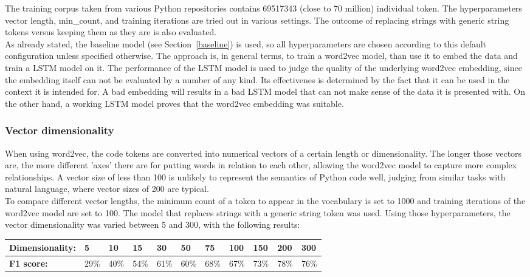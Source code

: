 \documentclass[
a4paper,
pagesize,
pdftex,
12pt,
twoside, %
BCOR=5mm, %
ngerman,
fleqn,
final,
]{scrartcl}
\begin{document}
	The training corpus taken from various Python repositories contains 69517343 (close to 70 million) individual token. The hyperparameters vector length, min\_count, and training iterations are tried out in various settings. The outcome of replacing strings with generic string tokens versus keeping them as they are is also evaluated.\\
	As already stated, the baseline model (see Section~\ref{baseline}) is used, so all hyperparameters are chosen according to this default configuration unless specified otherwise. The approach is, in general terms, to train a word2vec model, than use it to embed the data and train a LSTM model on it. The performance of the LSTM model is used to judge the quality of the underlying word2vec embedding, since the embedding itself can not be evaluated by a number of any kind. Its effectivenes is determined by the fact that it can be used in the context it is intended for. A bad embedding will results in a bad LSTM model that can not make sense of the data it is presented with. On the other hand, a working LSTM model proves that the word2vec embedding was suitable.
	
	\subsubsection{Vector dimensionality}
	When using word2vec, the code tokens are converted into numerical vectors of a certain length or dimensionality. The longer those vectors are, the more different 'axes' there are for putting words in relation to each other, allowing the word2vec model to capture more complex relationships. A vector size of less than 100 is unlikely to represent the semantics of Python code well, judging from similar tasks with natural language, where vector sizes of 200 are typical.\\
	To compare different vector lengths, the minimum count of a token to appear in the vocabulary is set to 1000 and training iterations of the word2vec model are set to 100. The model that replaces strings with a generic string token was used. Using those hyperparameters, the vector dimensionality was varied between 5 and 300, with the following results:	
	
	\begin{tabular}{| p{3.5cm}  | p{0.6cm} | p{0.6cm} | p{0.6cm} | p{0.6cm} | p{0.6cm} | p{0.6cm} | p{0.8cm} | p{0.8cm} | p{0.8cm} | p{0.8cm} | }
		\hline
		\textbf{Dimensionality:} & 5 & 10 & 15 & 30 & 50 & 75 & 100 & 150 & 200 & 300 \\
		\hline
		
		\textbf{F1 score:} & 29\% & 40\% & 54\% & 61\% & 60\% & 68\% & 67\% & 73\% & 78\% & 76\% \\
		\hline
		\hline
	\end{tabular}
	
\end{document}
